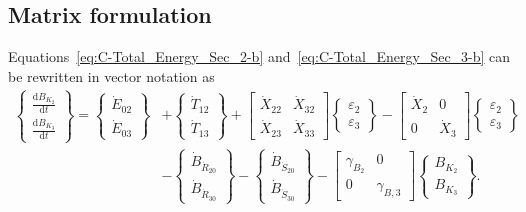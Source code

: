 \subsection{Matrix formulation} %
\label{sec:C-matrix}

Equations~\ref{eq:C-Total_Energy_Sec_2-b} 
and~\ref{eq:C-Total_Energy_Sec_3-b} can be rewritten 
in vector notation as
%
\begin{equation} \label{eq:C-Expanded_Matrix_Form}
	\begin{split}
		\begin{Bmatrix}
			\frac{\mathrm{d}B_{K_{2}}}{\mathrm{d}t} \\[0.4em] %
			\frac{\mathrm{d}B_{K_{3}}}{\mathrm{d}t} 
		\end{Bmatrix}
		=
		\begin{Bmatrix}
			\dot{E}_{02}\\
			\dot{E}_{03}
		\end{Bmatrix}
		& +                                               %
		\begin{Bmatrix}
			\dot{T}_{12}\\
			\dot{T}_{13}
		\end{Bmatrix}
		+
		\begin{bmatrix}
			\dot{X}_{22} & \dot{X}_{32}\\
			\dot{X}_{23} & \dot{X}_{33}
		\end{bmatrix}
		\begin{Bmatrix}
			\varepsilon_{2}\\
			\varepsilon_{3}
		\end{Bmatrix}   
		- 
		\begin{bmatrix}
			\dot{X}_{2} & 0          \\
			0           & \dot{X}_{3}
		\end{bmatrix}
		\begin{Bmatrix}
			\varepsilon_{2}\\
			\varepsilon_{3}
		\end{Bmatrix} \\                                 %
		& -                                              %
		\begin{Bmatrix}
			\dot{B}_{\dot{R}_{20}}  \\
			\dot{B}_{\dot{R}_{30}} 
		\end{Bmatrix}
		-
		\begin{Bmatrix}
			\dot{B}_{\dot{S}_{20}}  \\
			\dot{B}_{\dot{S}_{30}} 
		\end{Bmatrix}
		-
		\begin{bmatrix}
			\gamma_{B_{2}} & 0          \\
			0            & \gamma_{B,3}
		\end{bmatrix}
		\begin{Bmatrix}
			B_{K_{2}}\\
			B_{K_{3}}
		\end{Bmatrix}.
	\end{split}
\end{equation}
